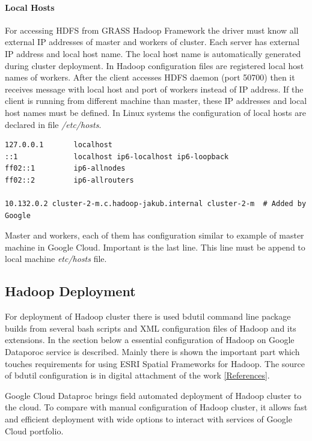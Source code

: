 \documentclass[a4paper,12pt,oneside]{report}
\begin{document}
	\paragraph{Local Hosts}\label{hosts} For accessing HDFS from GRASS Hadoop Framework the driver must
	know all external IP addresses of master and workers of cluster. Each server has
	external IP address and local host name. The local host name is automatically generated
	during cluster deployment. In Hadoop configuration files are registered local host
	names of workers. After the client accesses HDFS daemon (port 50700) then it receives
	message with local host and port of workers instead of IP address. If the client is
	running from different machine than master, these IP addresses and local host names
	must be defined. In Linux systems the configuration of local hosts  are declared in
	file \textit{/etc/hosts}. 
	\begin{footnotesize}
		\begin{lstlisting}[style=python]
127.0.0.1       localhost
::1             localhost ip6-localhost ip6-loopback
ff02::1         ip6-allnodes
ff02::2         ip6-allrouters

10.132.0.2 cluster-2-m.c.hadoop-jakub.internal cluster-2-m  # Added by Google
		\end{lstlisting}
	\end{footnotesize}
	Master and workers, each of them has configuration similar to example of master
	machine in Google Cloud. Important is the  last line. This line must be append to local
	machine \textit{etc/hosts} file.	
	
\subsection{Hadoop Deployment}\label{hadoop_deployment}
	For deployment of Hadoop cluster there is used bdutil command line package builds from
	several bash scripts and XML configuration files of Hadoop and its extensions. 
	In the section below a essential configuration of Hadoop on Google Dataporoc 
	service is described. Mainly there is shown the important part which touches requirements for using
	ESRI Spatial Frameworks for Hadoop. The source of bdutil configuration  is in digital attachment of the work \ref{References}.
	
	Google Cloud Dataproc brings field automated deployment of Hadoop
	cluster to the cloud. To compare with manual configuration of Hadoop cluster, it allows fast and efficient
	deployment with wide options to interact with services of Google Cloud portfolio.
	
\end{document}
